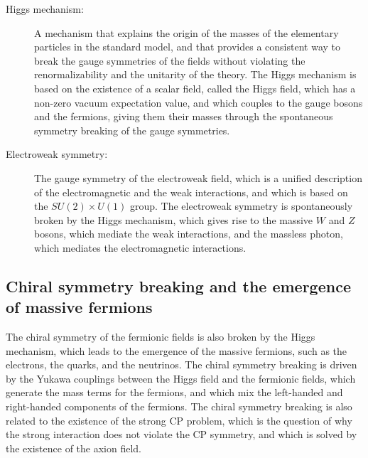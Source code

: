 \begin{tcolorbox}[colback=blue!5!white,colframe=blue!75!black,title=New terms]
\begin{description}
\item[Higgs mechanism:] A mechanism that explains the origin of the masses of the elementary particles in the standard model, and that provides a consistent way to break the gauge symmetries of the fields without violating the renormalizability and the unitarity of the theory. The Higgs mechanism is based on the existence of a scalar field, called the Higgs field, which has a non-zero vacuum expectation value, and which couples to the gauge bosons and the fermions, giving them their masses through the spontaneous symmetry breaking of the gauge symmetries.
\item[Electroweak symmetry:] The gauge symmetry of the electroweak field, which is a unified description of the electromagnetic and the weak interactions, and which is based on the $SU(2) \times U(1)$ group. The electroweak symmetry is spontaneously broken by the Higgs mechanism, which gives rise to the massive $W$ and $Z$ bosons, which mediate the weak interactions, and the massless photon, which mediates the electromagnetic interactions.
\end{description}
\end{tcolorbox}

\subsection{Chiral symmetry breaking and the emergence of massive fermions}
The chiral symmetry of the fermionic fields is also broken by the Higgs mechanism, which leads to the emergence of the massive fermions, such as the electrons, the quarks, and the neutrinos. The chiral symmetry breaking is driven by the Yukawa couplings between the Higgs field and the fermionic fields, which generate the mass terms for the fermions, and which mix the left-handed and right-handed components of the fermions. The chiral symmetry breaking is also related to the existence of the strong CP problem, which is the question of why the strong interaction does not violate the CP symmetry, and which is solved by the existence of the axion field.


